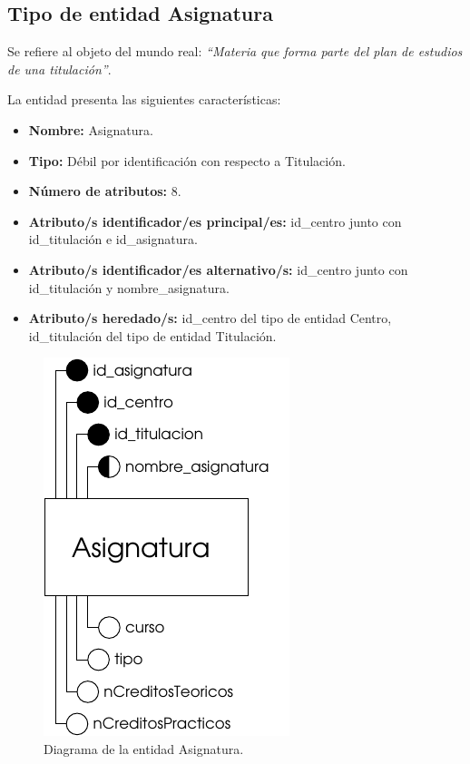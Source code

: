 \subsection{Tipo de entidad Asignatura}

   \begin{description}

   \item[Definición] Se refiere al objeto del mundo real: \emph{``Materia que
   forma parte del plan de estudios de una titulación''}.

   \item[Características] La entidad presenta las siguientes características:
      \begin{itemize}
         \item \textbf{Nombre:} Asignatura.
         \item \textbf{Tipo:} Débil por identificación con respecto a Titulación.
         \item \textbf{Número de atributos:} 8.
         \item \textbf{Atributo/s identificador/es principal/es:} id\_centro junto con \\id\_titulación e id\_asignatura.
         \item \textbf{Atributo/s identificador/es alternativo/s:} id\_centro junto con \\id\_titulación y nombre\_asignatura.
         \item \textbf{Atributo/s heredado/s:} id\_centro del tipo de entidad Centro, \\id\_titulación del tipo de entidad Titulación.
      \end{itemize}

   \item[Diagrama]
   \item \begin{figure}[h!]
            \begin{center}
            \includegraphics[]{07.Modelo_Entidad-Interrelacion/7.2.Analisis_Entidades/diagramas/asignatura.pdf}
            \caption{Diagrama de la entidad Asignatura.}
            \end{center}
         \end{figure}


\end{description}
